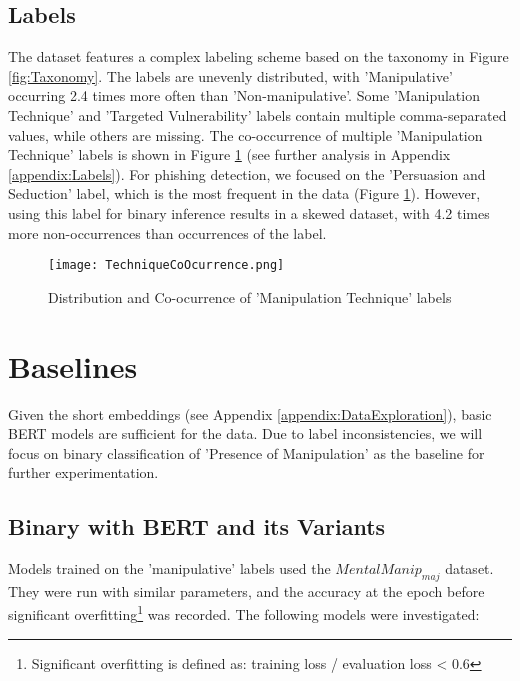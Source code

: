 \documentclass[
	letterpaper, %
	12pt, %
	unnumberedsections, %
	twoside, %
]{LTJournalArticle}
\begin{document}
\subsection{Labels}
The dataset features a complex labeling scheme based on the taxonomy in Figure \ref{fig:Taxonomy}. The labels are unevenly distributed, with 'Manipulative' occurring 2.4 times more often than 'Non-manipulative'. Some 'Manipulation Technique' and 'Targeted Vulnerability' labels contain multiple comma-separated values, while others are missing. The co-occurrence of multiple 'Manipulation Technique' labels is shown in Figure \ref{fig:TechCoOcurrence} (see further analysis in Appendix \ref{appendix:Labels}). For phishing detection, we focused on the 'Persuasion and Seduction' label, which is the most frequent in the data (Figure \ref{fig:TechCoOcurrence}). However, using this label for binary inference results in a skewed dataset, with 4.2 times more non-occurrences than occurrences of the label.

\begin{figure}[!htp] %
	\centering
	\texttt{[image: TechniqueCoOcurrence.png]}
	\caption{Distribution and Co-ocurrence of 'Manipulation Technique' labels}
	\label{fig:TechCoOcurrence}
\end{figure}







\section{Baselines}
Given the short embeddings (see Appendix \ref{appendix:DataExploration}), basic BERT models are sufficient for the data. Due to label inconsistencies, we will focus on binary classification of 'Presence of Manipulation' as the baseline for further experimentation.

\subsection{Binary with BERT and its Variants}
Models trained on the 'manipulative' labels used the $MentalManip_{maj}$ dataset. They were run with similar parameters, and the accuracy at the epoch before significant overfitting\footnote{Significant overfitting is defined as: training loss / evaluation loss < 0.6} was recorded. The following models were investigated:
\end{document}
